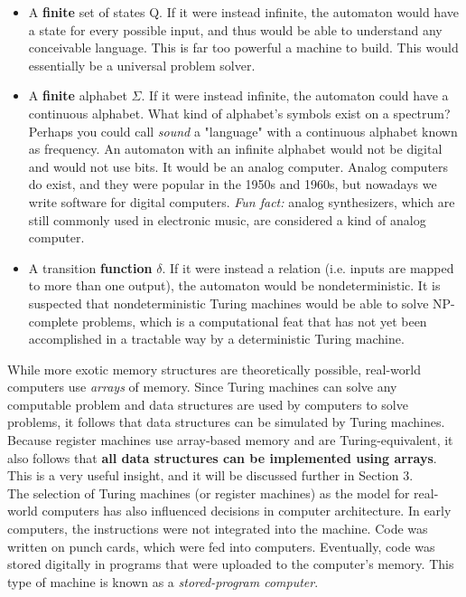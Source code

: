 \begin{tcolorbox}[breakable, enhanced, colback=textbook-blue, sharp corners]
	\begin{itemize}
		\item A \textbf{finite} set of states Q. If it were instead infinite, the automaton would have a state for every possible input, and thus would be able to understand any conceivable language. This is far too powerful a machine to build. This would essentially be a universal problem solver.
		\item A \textbf{finite} alphabet $\Sigma$. If it were instead infinite, the automaton could have a continuous alphabet. What kind of alphabet's symbols exist on a spectrum? Perhaps you could call \textit{sound} a "language" with a continuous alphabet known as frequency. An automaton with an infinite alphabet would not be digital and would not use bits. It would be an analog computer. Analog computers do exist, and they were popular in the 1950s and 1960s, but nowadays we write software for digital computers. \textit{Fun fact:} analog synthesizers, which are still commonly used in electronic music, are considered a kind of analog computer.
		\item A transition \textbf{function} $\delta$. If it were instead a relation (i.e. inputs are mapped to more than one output), the automaton would be nondeterministic. It is suspected that nondeterministic Turing machines would be able to solve NP-complete problems, which is a computational feat that has not yet been accomplished in a tractable way by a deterministic Turing machine.
	\end{itemize}

	\vspace{3mm}
	
\end{tcolorbox}
\vspace{2\baselineskip}

While more exotic memory structures are theoretically possible, real-world computers use \textit{arrays} of memory. Since Turing machines can solve any computable problem and data structures are used by computers to solve problems, it follows that data structures can be simulated by Turing machines. Because register machines use array-based memory and are Turing-equivalent, it also follows that \textbf{all data structures can be implemented using arrays}. This is a very useful insight, and it will be discussed further in Section 3. \\

The selection of Turing machines (or register machines) as the model for real-world computers has also influenced decisions in computer architecture. In early computers, the instructions were not integrated into the machine. Code was written on punch cards, which were fed into computers. Eventually, code was stored digitally in programs that were uploaded to the computer's memory. This type of machine is known as a \textit{stored-program computer}. \\

